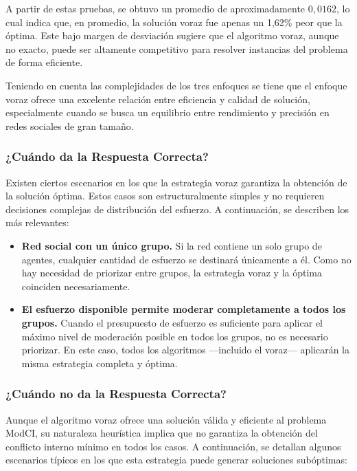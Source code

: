 \documentclass[11pt,letter]{article}
\begin{document}
    A partir de estas pruebas, se obtuvo un promedio de aproximadamente $0{,}0162$, lo cual indica que, en promedio, la solución voraz fue apenas un 1,62\% peor que la óptima. Este bajo margen de desviación sugiere que el algoritmo voraz, aunque no exacto, puede ser altamente competitivo para resolver instancias del problema de forma eficiente.


    Teniendo en cuenta las complejidades de los tres enfoques se tiene que el enfoque voraz ofrece una excelente relación entre eficiencia y calidad de solución, especialmente cuando se busca un equilibrio entre rendimiento y precisión en redes sociales de gran tamaño.

    \subsubsection{¿Cuándo da la Respuesta Correcta?}

    Existen ciertos escenarios en los que la estrategia voraz garantiza la obtención de la solución óptima. Estos casos son estructuralmente simples y no requieren decisiones complejas de distribución del esfuerzo. A continuación, se describen los más relevantes:
    
    \begin{itemize}
        \item \textbf{Red social con un único grupo.}  
        Si la red contiene un solo grupo de agentes, cualquier cantidad de esfuerzo se destinará únicamente a él. Como no hay necesidad de priorizar entre grupos, la estrategia voraz y la óptima coinciden necesariamente.

    
        \item \textbf{El esfuerzo disponible permite moderar completamente a todos los grupos.}  
        Cuando el presupuesto de esfuerzo es suficiente para aplicar el máximo nivel de moderación posible en todos los grupos, no es necesario priorizar. En este caso, todos los algoritmos —incluido el voraz— aplicarán la misma estrategia completa y óptima.
    
    \end{itemize}
        \subsubsection{¿Cuándo no da la Respuesta Correcta?}
    
    Aunque el algoritmo voraz ofrece una solución válida y eficiente al problema ModCI, su naturaleza heurística implica que no garantiza la obtención del conflicto interno mínimo en todos los casos. A continuación, se detallan algunos escenarios típicos en los que esta estrategia puede generar soluciones subóptimas:
    
\end{document}
